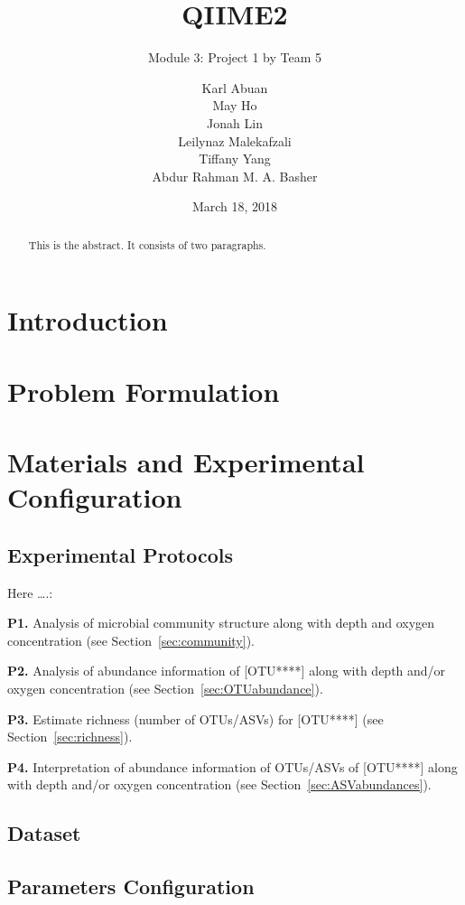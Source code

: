 \documentclass[11 pt,]{article}
\title{QIIME2}
\subtitle{Module 3: Project 1 by Team 5}
\author{Karl Abuan \\ May Ho \\ Jonah Lin \\ Leilynaz Malekafzali \\ Tiffany Yang \\ Abdur Rahman M. A. Basher}
\date{March 18, 2018}
\newcommand*{\secref}[1]{Section~\ref{#1}}
\begin{document}
\maketitle
\begin{abstract}
This is the abstract. It consists of two paragraphs.
\end{abstract}

{
\hypersetup{linkcolor=black}
\setcounter{tocdepth}{3}
\tableofcontents
}
\section{Introduction}\label{introduction}

\section{Problem Formulation}\label{problem-formulation}

\section{Materials and Experimental
Configuration}\label{materials-and-experimental-configuration}

\subsection{Experimental Protocols}\label{experimental-protocols}

Here \ldots{}.:

\textbf{P1.} Analysis of microbial community structure along with depth
and oxygen concentration (see \secref{sec:community}).

\textbf{P2.} Analysis of abundance information of {[}OTU****{]} along
with depth and/or oxygen concentration (see \secref{sec:OTUabundance}).

\textbf{P3.} Estimate richness (number of OTUs/ASVs) for {[}OTU****{]}
(see \secref{sec:richness}).

\textbf{P4.} Interpretation of abundance information of OTUs/ASVs of
{[}OTU****{]} along with depth and/or oxygen concentration (see
\secref{sec:ASVabundances}).

\subsection{Dataset}\label{dataset}

\subsection{Parameters Configuration}\label{parameters-configuration}
\end{document}
